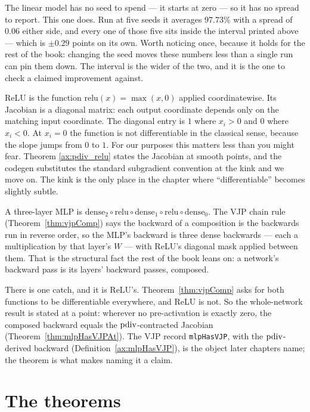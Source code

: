 The linear model has no seed to spend --- it starts at zero --- so it has
no spread to report. This one does. Run at
five seeds it averages $97.73\%$ with a spread of $0.06$ either side, and
every one of those five sits inside the interval printed above --- which
is $\pm 0.29$ points on its own. Worth noticing once, because it holds
for the rest of the book: changing the seed moves these numbers less than
a single run can pin them down. The interval is the wider of the two, and
it is the one to check a claimed improvement against.


ReLU is the function \(\mathrm{relu}(x) = \max(x, 0)\) applied
coordinatewise. Its Jacobian is a diagonal matrix: each output
coordinate depends only on the matching input coordinate. The
diagonal entry is \(1\) where \(x_i > 0\) and \(0\) where
\(x_i < 0\). At \(x_i = 0\) the function is not differentiable in
the classical sense, because the slope jumps from \(0\) to \(1\). For
our purposes this matters less than you might fear. Theorem
\ref{ax:pdiv_relu} states the Jacobian at smooth points, and the
codegen substitutes the standard subgradient convention at the
kink and we move on. The kink is the only place in the chapter
where ``differentiable'' becomes slightly subtle.


A three-layer MLP is
\(\mathrm{dense}_2 \circ \mathrm{relu} \circ \mathrm{dense}_1 \circ
\mathrm{relu} \circ \mathrm{dense}_0\). The VJP chain rule (Theorem~\ref{thm:vjpComp}) says the backward of a
composition is the backwards run in reverse order, so the MLP's backward
is three dense backwards --- each a multiplication by that layer's
\(W\) --- with ReLU's diagonal mask applied between them. That is the
structural fact the rest of the book leans on: a network's backward
pass is its layers' backward passes, composed.

There is one catch, and it is ReLU's. Theorem~\ref{thm:vjpComp} asks
for both functions to be differentiable everywhere, and ReLU is not. So
the whole-network result is stated at a point: wherever no
pre-activation is exactly zero, the composed backward equals the
\(\operatorname{pdiv}\)-contracted Jacobian (Theorem~\ref{thm:mlpHasVJPAt}). The VJP
record \texttt{mlpHasVJP}, with the \(\operatorname{pdiv}\)-derived backward
(Definition~\ref{ax:mlpHasVJP}), is the object later chapters name; the
theorem is what makes naming it a claim.

\section{The theorems}

